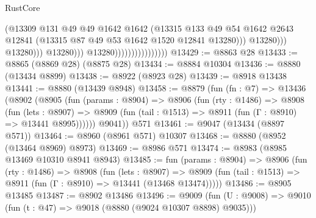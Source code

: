 \begin{lexlean}{RustCore}
\begin{coremodule}
                                                      (@13309
                                                        @131
                                                        @49
                                                        @49
                                                        @1642
                                                        @1642
                                                        (@13315
                                                          @133
                                                          @49
                                                          @54
                                                          @1642
                                                          @2643
                                                          @12841
                                                          (@13315
                                                            @87
                                                            @49
                                                            @53
                                                            @1642
                                                            @1520
                                                            @12841
                                                            @13280)))
                                                      @13280)))
                                                @13280)))
                                          @13280)))
                                    @13280))))))))))))))))
@13429 := @8863 @28
@13433 := @8865 (@8869 @28) (@8875 @28)
@13434 := @8884 @10304
@13436 := @8880 (@13434 @8899)
@13438 := @8922 (@8923 @28)
@13439 := @8918 @13438
@13441 := @8880 (@13439 @8948)
@13458 := @8879
    (fun (fn : @7) =>
    @13436
      (@8902
        (@8905
          (fun (params : @8904) =>
          @8906
            (fun (rty : @1486) =>
            @8908
              (fun (lets : @8907) =>
              @8909 (fun (tail : @1513) => @8911 (fun (Γ : @8910) => @13441 @8995))))))
        @9041))
    @571
@13461 := @9047 (@13434 (@8897 @571))
@13464 := @8960 (@8961 @571) @10307
@13468 := @8880 (@8952 (@13464 @8969) @8973)
@13469 := @8986 @571
@13474 := @8983 (@8985 @13469 @10310 @8941 @8943)
@13485 := fun (params : @8904) =>
  @8906
    (fun (rty : @1486) =>
    @8908
      (fun (lets : @8907) =>
      @8909 (fun (tail : @1513) => @8911 (fun (Γ : @8910) => @13441 (@13468 @13474)))))
@13486 := @8905 @13485
@13487 := @8902 @13486
@13496 := @9009
    (fun (U : @9008) => @9010 (fun (t : @47) => @9018 (@8880 (@9024 @10307 @8898) @9035)))

\end{coremodule}
\end{lexlean}
